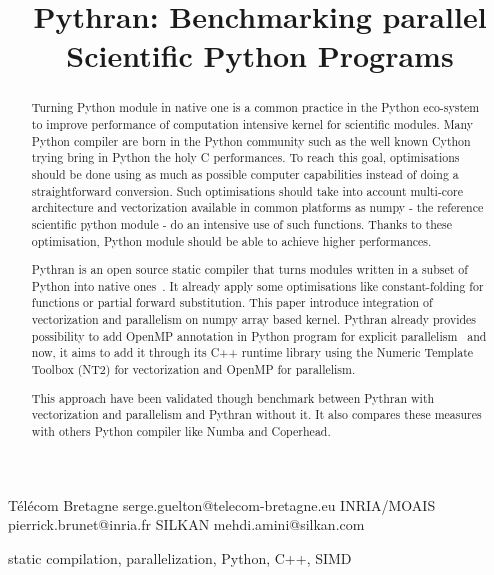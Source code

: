 \documentclass[10pt, onecolumn, preprint]{sigplanconf}
\begin{document}
\title{Pythran: Benchmarking parallel Scientific Python Programs}

           {T{\'e}l{\'e}com Bretagne}
           {serge.guelton@telecom-bretagne.eu}
           {INRIA/MOAIS}
           {pierrick.brunet@inria.fr}
           {SILKAN}
           {mehdi.amini@silkan.com}

\maketitle

\begin{abstract}

    Turning Python module in native one is a common practice in the Python
    eco-system to improve performance of computation intensive kernel for
    scientific modules. Many Python compiler are born in the Python community
    such as the well known Cython trying bring in Python the holy C
    performances. To reach this goal, optimisations should be done
    using as much as possible computer capabilities instead of doing a
    straightforward conversion. Such optimisations should take into account
    multi-core architecture and vectorization available in common
    platforms as numpy - the reference scientific python module - do an
    intensive use of such functions. Thanks to these optimisation,
    Python module should be able to achieve higher performances.

    Pythran is an open source static compiler that turns modules written
    in a subset of Python into native ones~\cite{pythran}. It already apply
    some optimisations like constant-folding for functions or partial forward
    substitution. This paper introduce integration of vectorization and
    parallelism on numpy array based kernel. Pythran already provides
    possibility to add OpenMP annotation in Python program for explicit
    parallelism~\cite{pythran-compas} and now, it aims to add it through its
    C++ runtime library using the Numeric Template Toolbox (NT2) for vectorization
    and OpenMP for parallelism.

    This approach have been validated though benchmark between Pythran with
    vectorization and parallelism and Pythran without it. It also compares these
    measures with others Python compiler like Numba and Coperhead.

\end{abstract}


\keywords
static compilation, parallelization, Python, C++, SIMD
\end{document}

